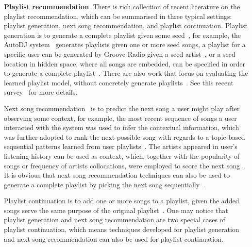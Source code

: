 {\bf Playlist recommendation}.
There is rich collection of recent literature on the playlist 
recommendation,
which can be summarised in three typical settings: 
playlist generation, next song recommendation, and playlist continuation.
Playlist generation is to generate a complete playlist given some seed~\cite{platt2002learning,mcfee2011natural,
mcfee2012hypergraph,chen2012playlist,ben2017groove},
for example, the AutoDJ system~\cite{platt2002learning} generates playlists given one or more seed songs,
a playlist for a specific user can be generated by Groove Radio given a seed artist~\cite{ben2017groove},
or a seed location in hidden space, where all songs are embedded,
can be specified in order to generate a complete playlist~\cite{chen2012playlist}.
There are also work that focus on evaluating the learned playlist model,
without concretely generate playlists~\cite{mcfee2011natural,mcfee2012hypergraph}.
See this recent survey~\cite{bonnin2015automated} for more details.

Next song recommendation~\cite{hariri2012context,bonnin2013evaluating,jannach2015beyond}
is to predict the next song a user might play after observing some context,
for example, the most recent sequence of songs a user interacted with the system was used to
infer the contextual information, which was further adopted to rank the next possible song
with regards to a topic-based sequential patterns learned from user playlists~\cite{hariri2012context}.
The artists appeared in user's listening history can be used as context,
which, together with the popularity of songs or frequency of artists collocations,
were employed to score the next song~\cite{mcfee2012million,bonnin2013evaluating}.
It is obvious that next song recommendation techniques can also be used to generate a
complete playlist by picking the next song sequentially~\cite{bonnin2013evaluating,ben2017groove}.

Playlist continuation is to add one or more songs to a playlist,
given the added songs serve the same purpose of the original playlist~\cite{schedl2017,recsysch2018}.
One may notice that playlist generation and next song recommendation are two special cases
of playlist continuation, which means techniques developed for playlist generation and
next song recommendation can also be used for playlist continuation.



